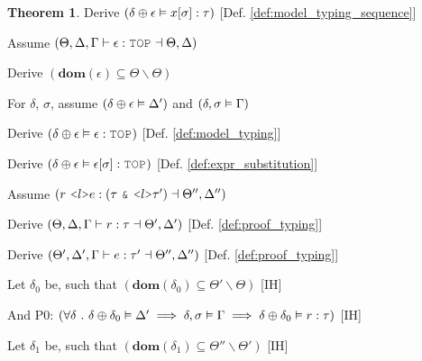 \documentclass[acmsmall]{acmart}
\theoremstyle{definition}
\newtheorem{theorem}{Theorem}[section]
\begin{document}
\begin{theorem}
  \item \I\I \N Derive $(
    \delta \oplus \epsilon \vDash x[\sigma] : \tau
  )$ [Def. \ref{def:model_typing_sequence}]


  \item \N Assume $(
    \Theta, \Delta, \Gamma \entails \epsilon \hastype \J{TOP} \given \Theta, \Delta
  )$

  \item \I \N Derive $(
    \textbf{dom}(\epsilon) \subseteq \Theta \backslash \Theta
  )$

  \item \I \N For $\delta$, $\sigma$,
    assume $(\delta \oplus \epsilon \vDash \Delta')$
    and $(\delta, \sigma \vDash \Gamma)$

  \item \I\I \N Derive $(
    \delta \oplus \epsilon \satisfies \epsilon \hastype \J{TOP}
  )$ [Def. \ref{def:model_typing}]

  \item \I\I \N Derive $(
    \delta \oplus \epsilon \satisfies \epsilon[\sigma] \hastype \J{TOP}
  )$ [Def. \ref{def:expr_substitution}]


  \item \N Assume $(
    r\ \J{<}l \J{>} e \hastype (\tau\ \J{\&}\ \J{<} l \J{>} \tau') \given \Theta'', \Delta''
  )$

  \item \I \N Derive $(
    \Theta, \Delta, \Gamma \vdash r : \tau \dashv \Theta', \Delta'
  )$ [Def. \ref{def:proof_typing}]

  \item \I \N Derive $(
    \Theta', \Delta', \Gamma \vdash e : \tau' \dashv \Theta'', \Delta''
  )$ [Def. \ref{def:proof_typing}]

  \item \I \N Let $\delta_0$ be, such that $(
    \textbf{dom}(\delta_0) \subseteq \Theta' \backslash \Theta
  )$ [IH]

  \item \I \N And P0: $(
    \forall \delta \ .\  
    \delta \oplus \delta_0 \vDash \Delta'
    \implies 
    \delta, \sigma \vDash \Gamma
    \implies 
    \delta \oplus \delta_0 \vDash r : \tau 
  )$ [IH]

  \item \I \N Let $\delta_1$ be, such that $(
    \textbf{dom}(\delta_1) \subseteq \Theta'' \backslash \Theta'
  )$ [IH]


\end{theorem}
\end{document}
